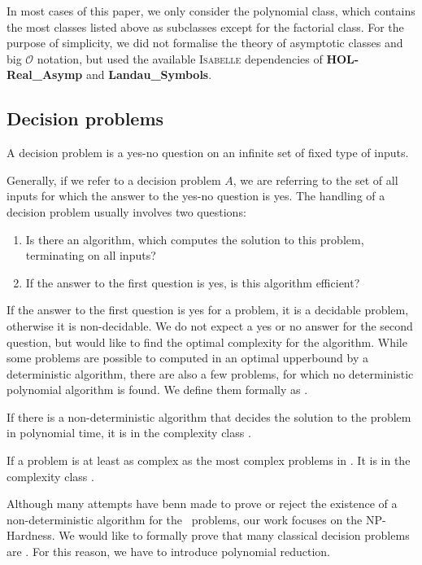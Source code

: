 In most cases of this paper, we only consider the polynomial class, which contains the most classes listed above 
as subclasses except for the factorial class. For the purpose of simplicity, we did not 
formalise the theory of asymptotic classes and big $\mathcal{O}$ notation, but used the 
available \textsc{Isabelle} dependencies of \textbf{HOL-Real\_Asymp} and \textbf{Landau\_Symbols}.

\subsection{Decision problems}
\begin{definition}
    A decision problem is a yes-no question on an infinite set of fixed type of inputs.
\end{definition}
Generally, if we refer to a decision problem $A$, we are referring to the set of all inputs for which the answer to the yes-no question is yes. 
The handling of a decision problem usually involves two questions:
\begin{enumerate}
    \item Is there an algorithm, which computes the solution to this problem, terminating on all inputs?
    \item If the answer to the first question is yes, is this algorithm efficient?
\end{enumerate}
If the answer to the first question is yes for a problem, it is a decidable problem, otherwise it is non-decidable. 
We do not expect a yes or no answer for the second question, but would like to find 
the optimal complexity for the algorithm. While some problems are possible to computed in 
an optimal upperbound by a deterministic algorithm, there are also a few problems, for which 
no deterministic polynomial algorithm is found. We define them formally as \NP.
\begin{definition}
    If there is a non-deterministic algorithm 
    that decides the solution to the problem in polynomial time, it is in the complexity 
    class \NP. 
\end{definition}
\begin{definition}
If a problem is at least as complex as the most complex problems in \NP. It is 
    in the complexity class \NPH.
\end{definition}

Although many attempts have benn made to prove or reject the existence of a non-deterministic algorithm 
for the \NP\ problems, our work focuses on the NP-Hardness. We would like to formally prove 
that many classical decision problems are \NPH. For this reason, we have to introduce polynomial reduction.

